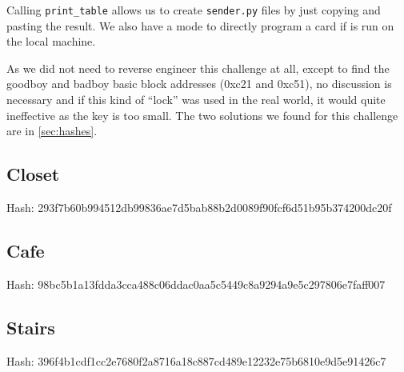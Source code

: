 Calling \texttt{print\_table} allows us to create \texttt{sender.py} files by just copying and pasting the result. We also have a mode to directly program a card if \angr is run on the local machine.

As we did not need to reverse engineer this challenge at all, except to find the goodboy and badboy basic block addresses (0xc21 and 0xc51), no discussion is necessary and if this kind of ``lock'' was used in the real world, it would quite ineffective as the key is too small.
The two solutions we found for this challenge are in \autoref{sec:hashes}.

\subsection{Closet}
Hash: 293f7b60b994512db99836ae7d5bab88b2d0089f90fcf6d51b95b374200dc20f

\subsection{Cafe}
Hash: 98bc5b1a13fdda3cca488c06ddac0aa5c5449c8a9294a9e5c297806e7faff007

\subsection{Stairs}
Hash: 396f4b1cdf1cc2e7680f2a8716a18c887cd489e12232e75b6810e9d5e91426c7
